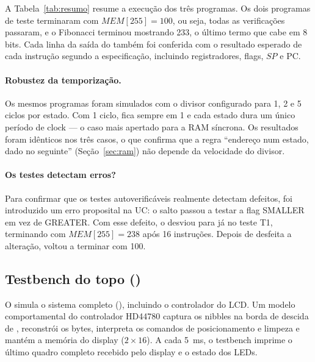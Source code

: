 A Tabela~\ref{tab:resumo} resume a execução dos três programas. Os dois
programas de teste terminaram com $MEM[255] = 100$, ou seja, todas as
verificações passaram, e o Fibonacci terminou mostrando 233, o último termo que
cabe em 8 bits. Cada linha da saída do  também foi conferida com o
resultado esperado de cada instrução segundo a especificação,
incluindo registradores, flags, $SP$ e PC.

\begin{table}[H]
\centering
\caption{Resultado da simulação dos programas.}
\label{tab:resumo}
\small

\end{table}

\paragraph{Robustez da temporização.} Os mesmos programas foram simulados com o
divisor configurado para 1, 2 e 5 ciclos por estado. Com 1 ciclo,  fica
sempre em 1 e cada estado dura um único período de clock --- o caso mais
apertado para a RAM síncrona. Os resultados foram idênticos nos três casos, o
que confirma que a regra ``endereço num estado, dado no seguinte''
(Seção~\ref{sec:ram}) não depende da velocidade do divisor.

\paragraph{Os testes detectam erros?} Para confirmar que os testes
autoverificáveis realmente detectam defeitos, foi introduzido um erro
proposital na UC: o salto  passou a testar a flag SMALLER em vez de
GREATER. Com esse defeito, o  desviou para  já no
teste T1, terminando com $MEM[255] = 238$ após 16 instruções. Depois de
desfeita a alteração, voltou a terminar com 100.

\subsection{Testbench do topo ()}

O  simula o sistema completo (), incluindo o
controlador do LCD. Um modelo comportamental do controlador HD44780 captura os
nibbles na borda de descida de , reconstrói os bytes, interpreta os
comandos de posicionamento e limpeza e mantém a memória do display ($2 \times
16$). A cada \SI{5}{\milli\second}, o testbench imprime o último quadro completo
recebido pelo display e o estado dos LEDs.

